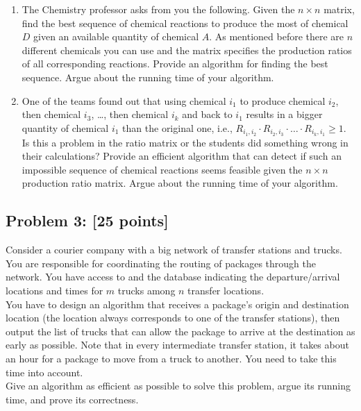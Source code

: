 \documentclass[11pt]{article}
\begin{document}
\begin{enumerate}[label=\Alph*.]
\item  The Chemistry professor asks from you the
following. Given the $n \times n$ matrix, find the best sequence of
chemical reactions to produce the most of chemical $D$ given an
available quantity of chemical $A$. As mentioned before there are $n$
different chemicals you can use and the matrix specifies the
production ratios of all corresponding reactions. Provide an algorithm
for finding the best sequence. Argue about the running time of your
algorithm.

\item  One of the teams found out that using chemical
$i_1$ to produce chemical $i_2$, then chemical $i_3$, \dots, then
chemical $i_k$ and back to $i_1$ results in a bigger quantity of
chemical $i_1$ than the original one, i.e., $R_{i_1,i_2} \cdot
R_{i_2,i_3} \cdot \ldots \cdot R_{i_k,i_1} \geq 1$. Is this a problem
in the ratio matrix or the students did something wrong in their
calculations? Provide an efficient algorithm that can detect if such
an impossible sequence of chemical reactions seems feasible given the
$n \times n$ production ratio matrix. Argue about the running time of
your algorithm.
\end{enumerate}

\subsection*{Problem 3: [25 points]} Consider a courier company with
a big network of transfer stations and trucks. You are responsible for
coordinating the routing of packages through the network. You have
access to and the database indicating the departure/arrival locations
and times for $m$ trucks among $n$ transfer locations.\\

\noindent You have to design an algorithm that receives a package's
origin and destination location (the location always corresponds to
one of the transfer stations), then output the list of trucks that can
allow the package to arrive at the destination as early as
possible. Note that in every intermediate transfer station, it takes
about an hour for a package to move from a truck to another. You need
to take this time into account.\\

\noindent Give an algorithm as efficient as possible to solve this
problem, argue its running time, and prove its correctness.\\
\end{document}
